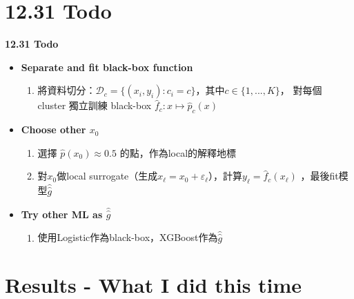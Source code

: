 \documentclass[12pt,aspectratio=43]{beamer}
\begin{document}
\section{12.31 Todo}

\begin{frame}{\textbf{12.31 Todo}}
\linespread{1.5}
  \begin{itemize}
    \item \textbf{Separate and fit black-box function}
    \begin{enumerate}[]
      \item 將資料切分：$\mathcal{D}_c=\{(x_i, y_i):c_i=c\}$，其中$c \in \{1,...,K\}$，
      對每個 cluster 獨立訓練 black-box $\hat{f}_c:x\longmapsto\hat{p}_c(x)$
    \end{enumerate}
  \end{itemize}

  \begin{itemize}
    \item \textbf{Choose other $x_0$}
    \begin{enumerate}[]
      \item 選擇 $\hat p(x_0)\approx 0.5$ 的點，作為local的解釋地標
      \item 對$x_0$做local surrogate（生成$x_{\ell}=x_0+\varepsilon_{\ell}$），計算$y_{\ell}=\hat{f}_c(x_{\ell})$
      ，最後fit模型$\hat{\hat{g}}$
    \end{enumerate}
  \end{itemize}

  \begin{itemize}
    \item \textbf{Try other ML as $\hat{\hat g}$}
    \begin{enumerate}[]
      \item 使用Logistic作為black-box，XGBoost作為$\hat{\hat g}$
    \end{enumerate}
  \end{itemize}
\end{frame}

\section{Results - What I did this time}
\end{document}
